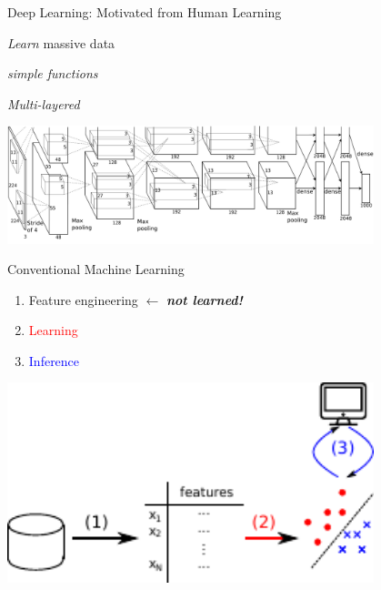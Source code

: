 \documentclass{beamer}
\newcommand{\tred}[1]{\textcolor{red}{#1}}
\newcommand{\tblue}[1]{\textcolor{blue}{#1}}
\begin{document}
\begin{frame}{Deep Learning: Motivated from Human Learning}
     \begin{minipage}{0.32\textwidth}
         \centering
         \small
         \textit{Learn} massive data
     \end{minipage}
     \hfill
     \begin{minipage}{0.32\textwidth}
         \centering
         \small
         \textit{simple functions}
     \end{minipage}
     \hfill
     \begin{minipage}{0.32\textwidth}
         \centering
         \small
         \textit{Multi-layered} 
     \end{minipage}

     \vspace{3mm}
    \centering
    \includegraphics[width=0.8\textwidth]{alex_imagenet}
    \\

    \vfill

\end{frame}

\begin{frame}{Conventional Machine Learning}
    \raggedright
    \begin{enumerate}
        \item Feature engineering $\leftarrow$ {\bf \emph{not learned!}}
        \item \tred{Learning}
        \item \tblue{Inference}
    \end{enumerate}

    \vspace{-24mm}
    \begin{center}
    \includegraphics[width=0.8\textwidth]{pipeline1.pdf}
    \end{center}

\end{frame}
\end{document}
